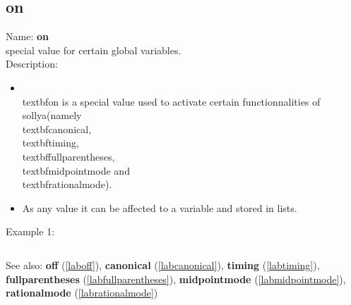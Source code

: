 \subsection{on}
\label{labon}
\noindent Name: \textbf{on}\\
special value for certain global variables.\\
\noindent Description: \begin{itemize}

\item \\textbf{on} is a special value used to activate certain functionnalities of \\sollya\n   (namely \\textbf{canonical}, \\textbf{timing}, \\textbf{fullparentheses}, \\textbf{midpointmode} and \\textbf{rationalmode}).\n
\item As any value it can be affected to a variable and stored in lists.\n\end{itemize}
\noindent Example 1: 
\begin{center}\begin{minipage}{15cm}\begin{Verbatim}[frame=single]
\end{Verbatim}
\end{minipage}\end{center}
See also: \textbf{off} (\ref{laboff}), \textbf{canonical} (\ref{labcanonical}), \textbf{timing} (\ref{labtiming}), \textbf{fullparentheses} (\ref{labfullparentheses}), \textbf{midpointmode} (\ref{labmidpointmode}), \textbf{rationalmode} (\ref{labrationalmode})
